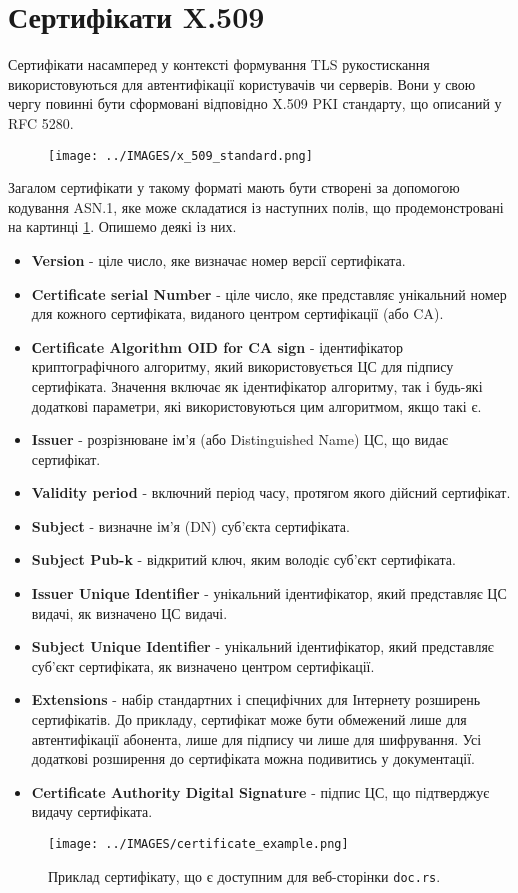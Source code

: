 \section{Сертифікати X.509}
Сертифікати насамперед у контексті формування TLS рукостискання використовуються для автентифікації користувачів чи серверів. Вони у свою чергу повинні бути сформовані відповідно X.509 PKI стандарту, що описаний у RFC 5280.
\begin{figure}[ht]
        \centering
        \texttt{[image: ../IMAGES/x\_509\_standard.png]}
        \label{x_509}
\end{figure}
Загалом сертифікати у такому форматі мають бути створені за допомогою кодування ASN.1, яке може  складатися із наступних полів, що продемонстровані на картинці \ref{x_509}. Опишемо деякі із них.
\begin{itemize}
    \item \textbf{Version} - ціле число, яке визначає номер версії сертифіката.
    \item \textbf{Certificate serial Number} - ціле число, яке представляє унікальний номер для кожного сертифіката, виданого центром сертифікації (або CA).
    \item \textbf{Сertificate Algorithm OID for CA sign} - ідентифікатор криптографічного алгоритму, який використовується ЦС для підпису сертифіката. Значення включає як ідентифікатор алгоритму, так і будь-які додаткові параметри, які використовуються цим алгоритмом, якщо такі є.
    \item \textbf{Issuer} - розрізнюване ім’я (або Distinguished Name) ЦС, що видає сертифікат.
    \item \textbf{Validity period} - включний період часу, протягом якого дійсний сертифікат.
    \item \textbf{Subject} - визначне ім'я (DN) суб'єкта сертифіката.
    \item \textbf{Subject Pub-k} - відкритий ключ, яким володіє суб’єкт сертифіката.
    \item \textbf{Issuer Unique Identifier} - унікальний ідентифікатор, який представляє ЦС видачі, як визначено ЦС видачі.
    \item \textbf{Subject Unique Identifier} - унікальний ідентифікатор, який представляє суб’єкт сертифіката, як визначено центром сертифікації.
    \item \textbf{Extensions} - набір стандартних і специфічних для Інтернету розширень сертифікатів. До прикладу, сертифікат може бути обмежений лише для автентифікації абонента, лише для підпису чи лише для шифрування. Усі додаткові розширення до сертифіката можна подивитись у документації.
    \item \textbf{Certificate Authority Digital Signature} - підпис ЦС, що підтверджує видачу сертифіката.
\end{itemize}
\begin{figure}[ht]
        \centering
        \texttt{[image: ../IMAGES/certificate\_example.png]}
        \label{certificate_example}
        \caption{Приклад сертифікату, що є доступним для веб-сторінки \texttt{doc.rs}.}
\end{figure}
